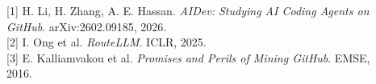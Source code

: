 \documentclass[final, xcolor={table,dvipsnames},t]{beamer}
\newlength{\sepwidthB}
\newlength{\colwidthB}
\newcommand{\separatorcolumnB}{\begin{column}{\sepwidthB}\end{column}}
\begin{document}
\begin{frame}[t]
\begin{columns}[t]
\begin{column}[T]{\colwidthB}
    \begin{block}{}
    \scriptsize
    \setlength{\parindent}{0pt}
    [1] H. Li, H. Zhang, A. E. Hassan. \emph{AIDev: Studying AI Coding Agents on GitHub}. arXiv:2602.09185, 2026.\\[0pt]
    [2] I. Ong et al. \emph{RouteLLM}. ICLR, 2025.\\[0pt]
    [3] E. Kalliamvakou et al. \emph{Promises and Perils of Mining GitHub}. EMSE, 2016.
    \end{block}

\end{column}
\separatorcolumnB
\end{columns}
\end{frame}
\end{document}

